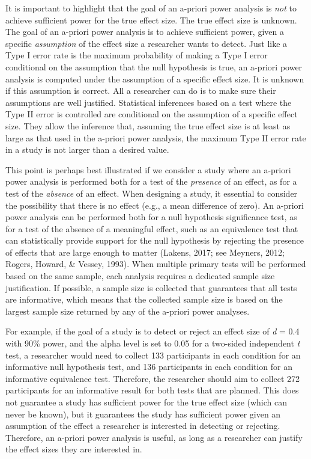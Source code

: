 \documentclass[
  english,
  ,jou, a4paper,floatsintext]{apa6}
\begin{document}
It is important to highlight that the goal of an a-priori power analysis is \emph{not} to achieve sufficient power for the true effect size. The true effect size is unknown. The goal of an a-priori power analysis is to achieve sufficient power, given a specific \emph{assumption} of the effect size a researcher wants to detect. Just like a Type I error rate is the maximum probability of making a Type I error conditional on the assumption that the null hypothesis is true, an a-priori power analysis is computed under the assumption of a specific effect size. It is unknown if this assumption is correct. All a researcher can do is to make sure their assumptions are well justified. Statistical inferences based on a test where the Type II error is controlled are conditional on the assumption of a specific effect size. They allow the inference that, assuming the true effect size is at least as large as that used in the a-priori power analysis, the maximum Type II error rate in a study is not larger than a desired value.

This point is perhaps best illustrated if we consider a study where an a-priori power analysis is performed both for a test of the \emph{presence} of an effect, as for a test of the \emph{absence} of an effect. When designing a study, it essential to consider the possibility that there is no effect (e.g., a mean difference of zero). An a-priori power analysis can be performed both for a null hypothesis significance test, as for a test of the absence of a meaningful effect, such as an equivalence test that can statistically provide support for the null hypothesis by rejecting the presence of effects that are large enough to matter (Lakens, 2017; see Meyners, 2012; Rogers, Howard, \& Vessey, 1993). When multiple primary tests will be performed based on the same sample, each analysis requires a dedicated sample size justification. If possible, a sample size is collected that guarantees that all tests are informative, which means that the collected sample size is based on the largest sample size returned by any of the a-priori power analyses.

For example, if the goal of a study is to detect or reject an effect size of \emph{d} = 0.4 with 90\% power, and the alpha level is set to 0.05 for a two-sided independent \emph{t} test, a researcher would need to collect 133 participants in each condition for an informative null hypothesis test, and 136 participants in each condition for an informative equivalence test. Therefore, the researcher should aim to collect 272 participants for an informative result for both tests that are planned. This does not guarantee a study has sufficient power for the true effect size (which can never be known), but it guarantees the study has sufficient power given an assumption of the effect a researcher is interested in detecting or rejecting. Therefore, an a-priori power analysis is useful, as long as a researcher can justify the effect sizes they are interested in.
\end{document}
